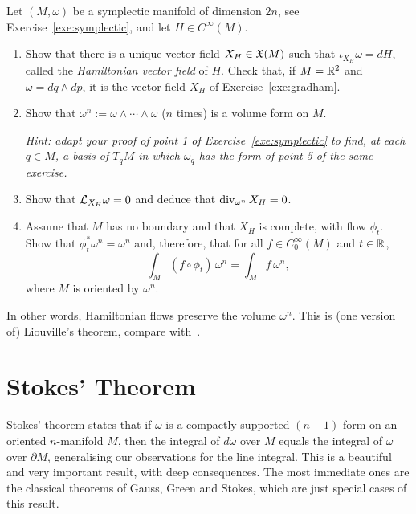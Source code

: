 \begin{exercise}\label{exe:liouville}
	Let $(M,\omega)$ be a symplectic manifold of dimension $2n$, see Exercise~\ref{exe:symplectic}, and let $H\in C^\infty(M)$.
	\begin{enumerate}
		\item Show that there is a unique vector field $X_H\in\mathfrak{X}(M)$ such that $\iota_{X_H}\omega = dH$, called the \emph{Hamiltonian vector field} of $H$.
		      Check that, if $M=\mathbb{R}^2$ and $\omega = dq\wedge dp$, it is the vector field $X_H$ of Exercise~\ref{exe:gradham}.
		\item Show that $\omega^n := \omega\wedge\cdots\wedge\omega$ ($n$ times) is a volume form on $M$.

		      \textit{\small Hint: adapt your proof of point 1 of Exercise~\ref{exe:symplectic} to find, at each $q\in M$, a basis of $T_qM$ in which $\omega_q$ has the form of point 5 of the same exercise.}
		\item Show that $\mathcal{L}_{X_H}\omega = 0$ and deduce that $\operatorname{div}_{\omega^n}X_H = 0$.
		\item Assume that $M$ has no boundary and that $X_H$ is complete, with flow $\phi_t$.
		      Show that $\phi_t^*\omega^n = \omega^n$ and, therefore, that for all $f\in C^\infty_0(M)$ and $t\in\mathbb{R}$,
		      \begin{equation}
			      \int_M (f\circ\phi_t)\,\omega^n = \int_M f\,\omega^n,
		      \end{equation}
		      where $M$ is oriented by $\omega^n$.
	\end{enumerate}
	In other words, Hamiltonian flows preserve the volume $\omega^n$. This is (one version of) Liouville's theorem, compare with~\cite[Theorem 3.30]{lectures:seri:hm}.
\end{exercise}

\section{Stokes' Theorem}

Stokes' theorem states that if $\omega$ is a compactly supported $(n-1)$-form on an oriented $n$-manifold $M$, then the integral of $d\omega$ over $M$ equals the integral of $\omega$ over $\partial M$, generalising our observations for the line integral.
This is a beautiful and very important result, with deep consequences. The most immediate ones are the classical theorems of Gauss, Green and Stokes, which are just special cases of this result.

